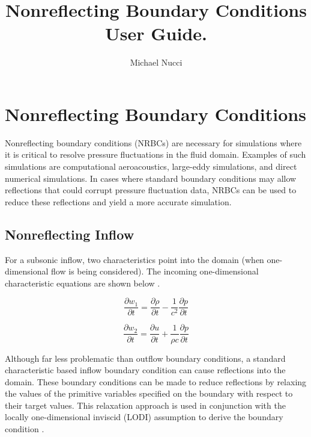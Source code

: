 \documentclass{article}
\begin{document}
\title{Nonreflecting Boundary Conditions User Guide.}

\author{ Michael Nucci }

\maketitle
\section{Nonreflecting Boundary Conditions}

Nonreflecting boundary conditions (NRBCs) are necessary for simulations where it is critical to resolve pressure fluctuations in the fluid domain. Examples of such simulations are computational aeroacoustics, large-eddy simulations, and direct numerical simulations.  In cases where standard boundary conditions may allow reflections that could corrupt pressure fluctuation data, NRBCs can be used to reduce these reflections and yield a more accurate simulation.

\subsection{Nonreflecting Inflow}

For a subsonic inflow, two characteristics point into the domain (when one-dimensional flow is being considered). The incoming one-dimensional characteristic equations are shown below \cite{Hirsch}.

\begin{equation}
\frac{\partial w_1}{\partial t} = \frac{\partial \rho}{\partial t} - \frac{1}{c^2} \frac{\partial p}{\partial t}
\end{equation}

\begin{equation}
\frac{\partial w_2}{\partial t} = \frac{\partial u}{\partial t} + \frac{1}{\rho c} \frac{\partial p}{\partial t}
\end{equation}

Although far less problematic than outflow boundary conditions, a standard characteristic based inflow boundary condition can cause reflections into the domain. These boundary conditions can be made to reduce reflections by relaxing the values of the primitive variables specified on the boundary with respect to their target values. This relaxation approach is used in conjunction with the locally one-dimensional inviscid (LODI) assumption to derive the boundary condition \cite{Yoo2}. 
\end{document}
